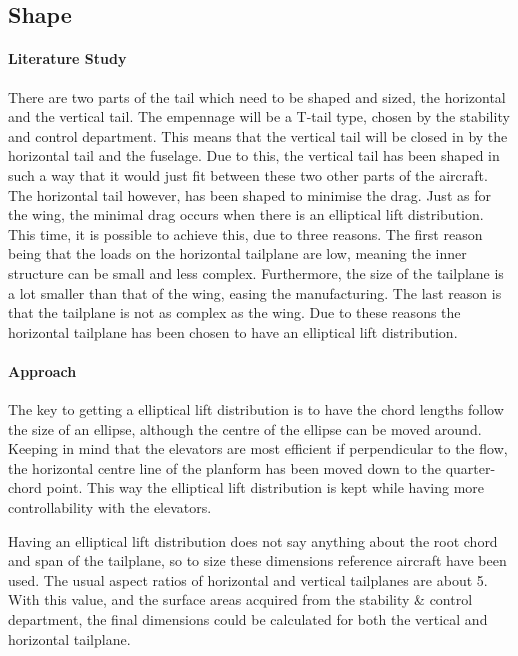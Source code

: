 \subsection*{Shape}

\paragraph{Literature Study} There are two parts of the tail which need to be shaped and sized, the horizontal and the vertical tail. The empennage will be a T-tail type, chosen by the stability and control department. This means that the vertical tail will be closed in by the horizontal tail and the fuselage. Due to this, the vertical tail has been shaped in such a way that it would just fit between these two other parts of the aircraft. The horizontal tail however, has been shaped to minimise the drag. Just as for the wing, the minimal drag occurs when there is an elliptical lift distribution. This time, it is possible to achieve this, due to three reasons. The first reason being that the loads on the horizontal tailplane are low, meaning the inner structure can be small and less complex. Furthermore, the size of the tailplane is a lot smaller than that of the wing, easing the manufacturing. The last reason is that the tailplane is not as complex as the wing. Due to these reasons the horizontal tailplane has been chosen to have an elliptical lift distribution.

\paragraph{Approach} The key to getting a elliptical lift distribution is to have the chord lengths follow the size of an ellipse, although the centre of the ellipse can be moved around. Keeping in mind that the elevators are most efficient if perpendicular to the flow, the horizontal centre line of the planform has been moved down to the quarter-chord point. This way the elliptical lift distribution is kept while having more controllability with the elevators. 

Having an elliptical lift distribution does not say anything about the root chord and span of the tailplane, so to size these dimensions reference aircraft have been used. The usual aspect ratios of horizontal and vertical tailplanes are about 5. With this value, and the surface areas acquired from the stability \& control department, the final dimensions could be calculated for both the vertical and horizontal tailplane.


